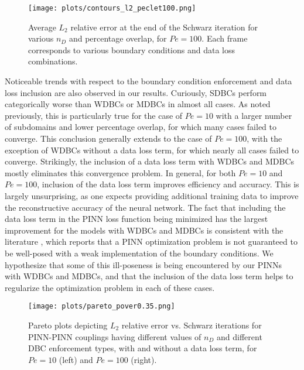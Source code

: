 \documentclass[oneside,final]{csri23}
\begin{document}
\begin{figure}
    \centering
    \texttt{[image: plots/contours\_l2\_peclet100.png]}
    \caption{Average $L_2$ relative error at the end of the Schwarz iteration for various $n_D$ and percentage overlap, for $Pe = 100$. Each frame corresponds to various boundary conditions and data loss combinations.}
    \label{fig:l2_sweep100}
\end{figure}

Noticeable trends with respect to the boundary condition enforcement and data loss inclusion are also observed in our results. Curiously, SDBCs perform categorically worse than WDBCs or MDBCs in almost all cases. As noted previously, this is particularly true for the case of $Pe = 10$ with a larger number of subdomains and lower percentage overlap, for which many cases failed to converge. This conclusion generally extends to the case of $Pe = 100$, with the exception of WDBCs without a data loss term, for which nearly all cases failed to converge. Strikingly, the inclusion of a data loss term with WDBCs and MDBCs mostly eliminates this convergence problem. %
In general, for both $Pe = 10$ and $Pe = 100$, inclusion of the data loss term improves efficiency and accuracy. This is largely unsurprising, as one expects providing additional training data to improve the reconstructive accuracy of the neural network.
The fact that including the data loss term in the PINN loss function being minimized has the largest improvement for the models with WDBCs and MDBCs is consistent with the literature \cite{WDS:Faroughi2023, WDS:Rao2021}, which
reports that a PINN optimization problem is not guaranteed to be well-posed with a weak implementation of the boundary conditions.
We hypothesize that some of this ill-poseness is being encountered by our PINNs with WDBCs and MDBCs, and that the inclusion
of the data loss term helps to regularize the optimization problem in each of these cases.

\begin{figure}
    \centering
    \texttt{[image: plots/pareto\_pover0.35.png]}
    \caption{Pareto plots depicting $L_2$ relative error vs. Schwarz iterations for PINN-PINN couplings having different values of $n_D$ and different DBC enforcement types, with and without a data loss term, for $Pe = 10$ (left) and $Pe = 100$ (right).}
    \label{fig:pareto}
\end{figure}
\end{document}
